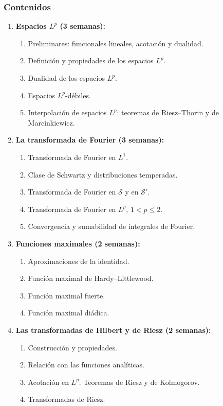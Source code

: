 \begin{refsection}
\subsubsection*{Contenidos}

\begin{enumerate}
\item \textbf{Espacios $L^p$ (3 semanas):}
\begin{enumerate}
    \item Preliminares: funcionales lineales, acotación y dualidad.
    \item Definición y propiedades de los espacios $L^p$.
    \item Dualidad de los espacios $L^p$.
    \item Espacios $L^p$-débiles.
    \item Interpolación de espacios $L^p$: teoremas de Riesz--Thorin y de Marcinkiewicz.
\end{enumerate}

\item \textbf{La transformada de Fourier (3 semanas):}
\begin{enumerate}
    \item Transformada de Fourier en $L^1$.
    \item Clase de Schwartz y distribuciones temperadas.
    \item Transformada de Fourier en $\mathcal{S}$ y en $\mathcal{S}'$.
    \item Transformada de Fourier en $L^p$, $1<p\le 2$.
    \item Convergencia y sumabilidad de integrales de Fourier.
\end{enumerate}

\item \textbf{Funciones maximales (2 semanas):}
\begin{enumerate}
    \item Aproximaciones de la identidad.
    \item Función maximal de Hardy--Littlewood.
    \item Función maximal fuerte.
    \item Función maximal diádica.
\end{enumerate}

\item \textbf{Las transformadas de Hilbert y de Riesz (2 semanas):}
\begin{enumerate}
    \item Construcción y propiedades.
    \item Relación con las funciones analíticas.
    \item Acotación en $L^p$. Teoremas de Riesz y de Kolmogorov.
    \item Transformadas de Riesz.
\end{enumerate}


\end{enumerate}
\end{refsection}
